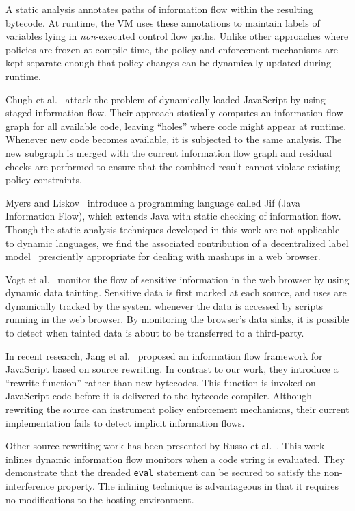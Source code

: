 A static analysis annotates paths of information flow within the resulting bytecode.
At runtime, the VM uses these annotations to maintain labels of variables lying in \emph{non}-executed control flow paths.
Unlike other approaches where policies are frozen at compile time, the policy and enforcement mechanisms are kept separate enough that policy changes can be dynamically updated during runtime.

Chugh et al.~\cite{1542483} attack the problem of dynamically loaded JavaScript by using staged information flow.
Their approach statically computes an information flow graph for all available code, leaving ``holes'' where code might appear at runtime.
Whenever new code becomes available, it is subjected to the same analysis.
The new subgraph is merged with the current information flow graph and residual checks are performed to ensure that the combined result cannot violate existing policy constraints.

Myers and Liskov~\cite{363526} introduce a programming language called Jif (Java Information Flow), which extends Java with static checking of information flow.
Though the static analysis techniques developed in this work are not applicable to dynamic languages, we find the associated contribution of a decentralized label model~\cite{363526} presciently appropriate for dealing with mashups in a web browser.

Vogt et al.~\cite{Vogt_CrossSiteScripting_2007} monitor the flow of sensitive information in the web browser by using dynamic data tainting.
Sensitive data is first marked at each source, and uses are dynamically tracked by the system whenever the data is accessed by scripts running in the web browser.
By monitoring the browser's data sinks, it is possible to detect when tainted data is about to be transferred to a third-party.

In recent research, Jang et al.~\cite{1866339} proposed an information flow framework for JavaScript based on source rewriting.
In contrast to our work, they introduce a ``rewrite function'' rather than new bytecodes.
This function is invoked on JavaScript code before it is delivered to the bytecode compiler.
Although rewriting the source can instrument policy enforcement mechanisms, their current implementation fails to detect implicit information flows.

Other source-rewriting work has been presented by Russo et al.~\cite{onthefly}.
This work inlines dynamic information flow monitors when a code string is evaluated.
They demonstrate that the dreaded \texttt{eval} statement can be secured to satisfy the non-interference property.
The inlining technique is advantageous in that it requires no modifications to the hosting environment.

